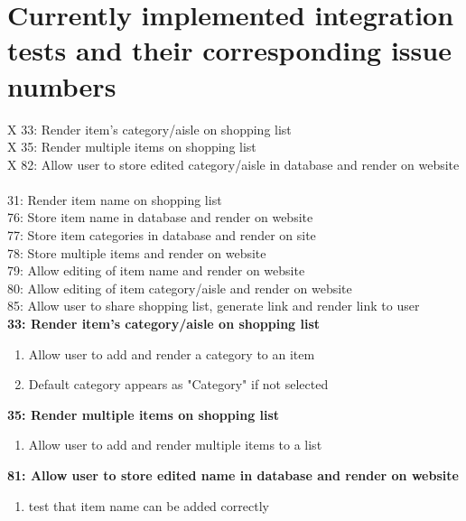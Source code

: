 \documentclass[10pt,onecolumn]{witseiepaper}
\begin{document}
\vspace{5mm}
\section*{Currently implemented integration tests and their corresponding issue numbers}

X 33: Render item's category/aisle on shopping list ~\\
X 35: Render multiple items on shopping list ~\\
X 82: Allow user to store edited category/aisle in database and render on website ~\\
31: Render item name on shopping list ~\\
76: Store item name in database and render on website ~\\
77: Store item categories in database and render on site ~\\
78: Store multiple items and render on website ~\\
79: Allow editing of item name and render on website ~\\
80: Allow editing of item category/aisle and render on website ~\\
85: Allow user to share shopping list, generate link and render link to user ~\\


\textbf{33: Render item's category/aisle on shopping list}

\begin{enumerate}
	\item Allow user to add and render a category to an item
	\item Default category appears as "Category" if not selected
\end{enumerate}

\textbf{35: Render multiple items on shopping list}

\begin{enumerate}
	\item Allow user to add and render multiple items to a list
\end{enumerate}

\textbf{81: Allow user to store edited name in database and render on website}

\begin{enumerate}
	\item test that item name can be added correctly
\end{enumerate}
\end{document}
